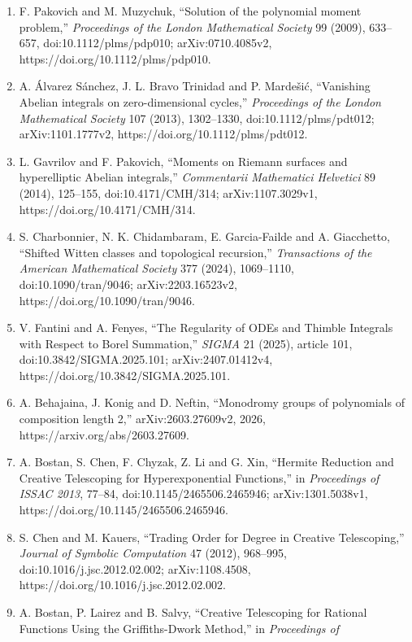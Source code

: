 \documentclass[
  11pt,
  a4paper,
]{amsart}
\providecommand{\tightlist}{%
  \setlength{\itemsep}{0pt}\setlength{\parskip}{0pt}}
\begin{document}
\begin{enumerate}
\def\labelenumi{\arabic{enumi}.}
\tightlist
\item
  F. Pakovich and M. Muzychuk, ``Solution of the polynomial moment
  problem,'' \emph{Proceedings of the London Mathematical Society} 99
  (2009), 633--657, doi:10.1112/plms/pdp010; arXiv:0710.4085v2,
  https://doi.org/10.1112/plms/pdp010.
\item
  A. Álvarez Sánchez, J. L. Bravo Trinidad and P. Mardešić, ``Vanishing
  Abelian integrals on zero-dimensional cycles,'' \emph{Proceedings of
  the London Mathematical Society} 107 (2013), 1302--1330,
  doi:10.1112/plms/pdt012; arXiv:1101.1777v2,
  https://doi.org/10.1112/plms/pdt012.
\item
  L. Gavrilov and F. Pakovich, ``Moments on Riemann surfaces and
  hyperelliptic Abelian integrals,'' \emph{Commentarii Mathematici
  Helvetici} 89 (2014), 125--155, doi:10.4171/CMH/314;
  arXiv:1107.3029v1, https://doi.org/10.4171/CMH/314.
\item
  S. Charbonnier, N. K. Chidambaram, E. Garcia-Failde and A. Giacchetto,
  ``Shifted Witten classes and topological recursion,''
  \emph{Transactions of the American Mathematical Society} 377 (2024),
  1069--1110, doi:10.1090/tran/9046; arXiv:2203.16523v2,
  https://doi.org/10.1090/tran/9046.
\item
  V. Fantini and A. Fenyes, ``The Regularity of ODEs and Thimble
  Integrals with Respect to Borel Summation,'' \emph{SIGMA} 21 (2025),
  article 101, doi:10.3842/SIGMA.2025.101; arXiv:2407.01412v4,
  https://doi.org/10.3842/SIGMA.2025.101.
\item
  A. Behajaina, J. Konig and D. Neftin, ``Monodromy groups of
  polynomials of composition length 2,'' arXiv:2603.27609v2, 2026,
  https://arxiv.org/abs/2603.27609.
\item
  A. Bostan, S. Chen, F. Chyzak, Z. Li and G. Xin, ``Hermite Reduction
  and Creative Telescoping for Hyperexponential Functions,'' in
  \emph{Proceedings of ISSAC 2013}, 77--84, doi:10.1145/2465506.2465946;
  arXiv:1301.5038v1, https://doi.org/10.1145/2465506.2465946.
\item
  S. Chen and M. Kauers, ``Trading Order for Degree in Creative
  Telescoping,'' \emph{Journal of Symbolic Computation} 47 (2012),
  968--995, doi:10.1016/j.jsc.2012.02.002; arXiv:1108.4508,
  https://doi.org/10.1016/j.jsc.2012.02.002.
\item
  A. Bostan, P. Lairez and B. Salvy, ``Creative Telescoping for Rational
  Functions Using the Griffiths-Dwork Method,'' in \emph{Proceedings of
}
\end{enumerate}
\end{document}
